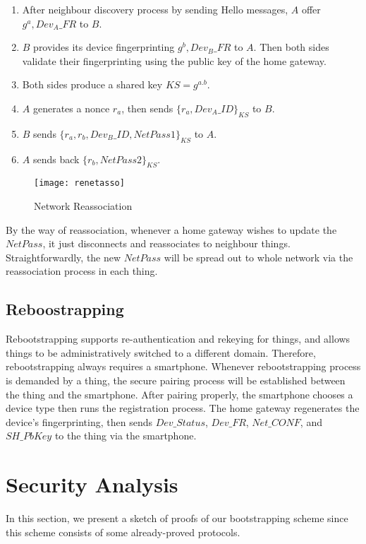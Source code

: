 \begin{enumerate}
\item After neighbour discovery process by sending Hello messages, $A$ offer $g^a, Dev_{A}\_FR$ to $B$. 
\item $B$ provides its device fingerprinting $g^b,Dev_{B}\_FR$ to $A$. Then both sides validate their fingerprinting using the public key of the home gateway. 
\item Both sides produce a shared key $KS = g^{a.b}$. 
\item $A$ generates a nonce $r_a$, then sends $\{r_a, Dev_{A}\_ID\}_{KS}$ to $B$.
\item $B$ sends $\{r_a,r_b,Dev_{B}\_ID, NetPass1\}_{KS}$ to $A$. 
\item $A$ sends back $\{r_b,NetPass2\}_{KS}$.
\end{enumerate}

\begin{figure}
  \centering
  \texttt{[image: renetasso]}
  \caption{Network Reassociation}
  \label{renetasso}
\end{figure}

By the way of reassociation, whenever a home gateway wishes to update the $NetPass$, it just disconnects and reassociates to neighbour things. Straightforwardly, the new $NetPass$ will be spread out to whole network via the reassociation process in each thing. 

\subsection{Reboostrapping}

Rebootstrapping supports re-authentication and rekeying for things, and allows things to be administratively switched to a different domain. Therefore, rebootstrapping always requires a smartphone. Whenever rebootstrapping process is demanded by a thing, the secure pairing process will be established between the thing and the smartphone. After pairing properly, the smartphone chooses a device type then runs the registration process. The home gateway regenerates the device's fingerprinting, then sends $Dev\_Status$, $Dev\_FR$, $Net\_CONF$, and $SH\_PbKey$ to the thing via the smartphone. 
 
\section{Security Analysis}\label{validation}

In this section, we present a sketch of proofs of our bootstrapping scheme since this scheme consists of some already-proved protocols.

